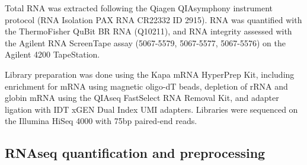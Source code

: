 %

Total RNA was extracted following the Qiagen QIAsymphony instrument protocol (RNA Isolation PAX RNA CR22332 ID 2915).
RNA was quantified with the ThermoFisher QuBit BR RNA (Q10211), 
and RNA integrity assessed with the Agilent RNA ScreenTape assay (5067-5579, 5067-5577, 5067-5576) on the Agilent 4200 TapeStation.

Library preparation was done using the Kapa mRNA HyperPrep Kit, including enrichment for mRNA using magnetic oligo-dT beads, depletion of rRNA and globin mRNA using the QIAseq FastSelect RNA Removal Kit, and adapter ligation with IDT xGEN Dual Index UMI adapters.
Libraries were sequenced on the Illumina HiSeq 4000 with \si{75}{bp} paired-end reads.

\subsection{RNAseq quantification and preprocessing}

